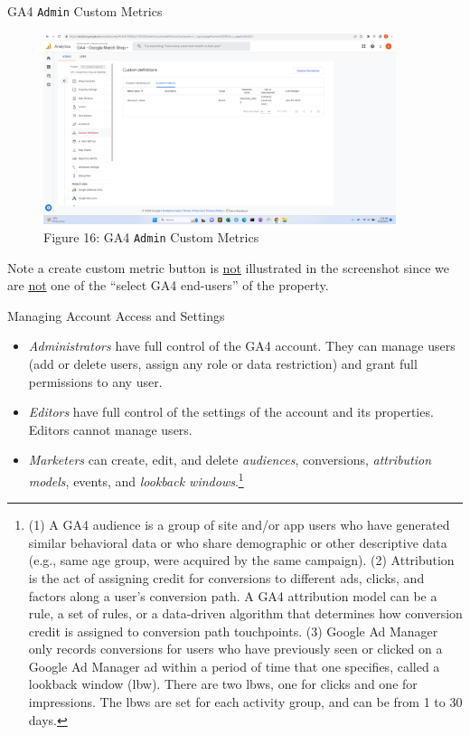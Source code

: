 \documentclass[pdf]{beamer}
\theoremstyle{remark}
\theoremstyle{definition}
\begin{document}
\begin{frame}[t]{GA4 \texttt{Admin} Custom Metrics}
\begin{figure}[htbp]
  \captionsetup{justification=centering}
  \includegraphics[height=5.6cm, trim=1.5cm 0.0cm 2.0cm 0.0cm width=5.6cm]{Images/G4A_7c_091923_Admin_Customdefinitions_Custommetrics.png}
  \caption{Figure {\color{franklinblue} 16}: GA4 \texttt{Admin} Custom Metrics}
\end{figure}
\vspace{-2.0ex}
\small
Note a  {\color{blue} create custom metric} button is \underline{not} illustrated in the screenshot since we are \underline{not} one of the ``select GA4 end-users'' of the property. 
\end{frame}

\begin{frame}[t]{Managing Account Access and Settings}
\small 
\begin{itemize}
  \item \textit{Administrators} have full control of the GA4 account. They can manage users (add or delete users, assign any role or data restriction) and grant full permissions to any user.
  \item \textit{Editors} have full control of the settings of the account and its properties. Editors cannot manage users.
  \item \textit{Marketers}  can create, edit, and delete \textit{audiences}, conversions, \textit{attribution models}, events, and \textit{lookback windows}.\footnote{(1) A GA4 audience is a group of site and/or app users who have generated similar behavioral data or who share demographic or other descriptive data (e.g., same age group, were acquired by the same campaign). (2) Attribution is the act of assigning credit for conversions to different ads, clicks, and factors along a user's conversion path. A GA4 attribution model can be a rule, a set of rules, or a data-driven algorithm that determines how conversion credit is assigned to conversion path touchpoints. (3) Google Ad Manager only records conversions for users who have previously seen or clicked on a Google Ad Manager ad within a period of time that one specifies, called a lookback window (lbw). There are two lbws, one for clicks and one for impressions. The lbws are set for each activity group, and can be from 1 to 30 days.}
\end{itemize}
\end{frame}
\end{document}
